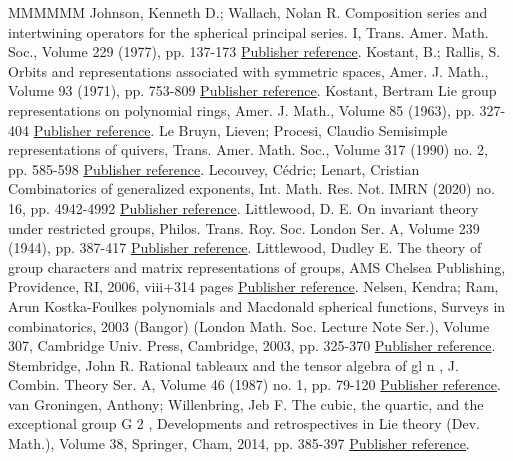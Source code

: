 \begin{thebibliography}{MMMMMM}
 Johnson, Kenneth D.; Wallach, Nolan R. Composition series and intertwining operators for the spherical principal series. I, Trans. Amer. Math. Soc., Volume 229 (1977), pp. 137-173 \href{https://alco.centre-mersenne.org/articles/10.5802/alco.391/#JohnsonWallach1977}{Publisher reference}.
 Kostant, B.; Rallis, S. Orbits and representations associated with symmetric spaces, Amer. J. Math., Volume 93 (1971), pp. 753-809 \href{https://alco.centre-mersenne.org/articles/10.5802/alco.391/#KostantRallis1971}{Publisher reference}.
 Kostant, Bertram Lie group representations on polynomial rings, Amer. J. Math., Volume 85 (1963), pp. 327-404 \href{https://alco.centre-mersenne.org/articles/10.5802/alco.391/#Kostant1963}{Publisher reference}.
 Le Bruyn, Lieven; Procesi, Claudio Semisimple representations of quivers, Trans. Amer. Math. Soc., Volume 317 (1990) no. 2, pp. 585-598 \href{https://alco.centre-mersenne.org/articles/10.5802/alco.391/#LeBryunProcesi1990}{Publisher reference}.
 Lecouvey, Cédric; Lenart, Cristian Combinatorics of generalized exponents, Int. Math. Res. Not. IMRN (2020) no. 16, pp. 4942-4992 \href{https://alco.centre-mersenne.org/articles/10.5802/alco.391/#LecouveyLenart2020}{Publisher reference}.
 Littlewood, D. E. On invariant theory under restricted groups, Philos. Trans. Roy. Soc. London Ser. A, Volume 239 (1944), pp. 387-417 \href{https://alco.centre-mersenne.org/articles/10.5802/alco.391/#Littlewood1944}{Publisher reference}.
 Littlewood, Dudley E. The theory of group characters and matrix representations of groups, AMS Chelsea Publishing, Providence, RI, 2006, viii+314 pages \href{https://alco.centre-mersenne.org/articles/10.5802/alco.391/#Littlewood1945}{Publisher reference}.
 Nelsen, Kendra; Ram, Arun Kostka-Foulkes polynomials and Macdonald spherical functions, Surveys in combinatorics, 2003 (Bangor) (London Math. Soc. Lecture Note Ser.), Volume 307, Cambridge Univ. Press, Cambridge, 2003, pp. 325-370 \href{https://alco.centre-mersenne.org/articles/10.5802/alco.391/#NelsenRam2003}{Publisher reference}.
 Stembridge, John R. Rational tableaux and the tensor algebra of  gl  n , J. Combin. Theory Ser. A, Volume 46 (1987) no. 1, pp. 79-120 \href{https://alco.centre-mersenne.org/articles/10.5802/alco.391/#STEMBRIDGE198779}{Publisher reference}.
 van Groningen, Anthony; Willenbring, Jeb F. The cubic, the quartic, and the exceptional group G 2 , Developments and retrospectives in Lie theory (Dev. Math.), Volume 38, Springer, Cham, 2014, pp. 385-397 \href{https://alco.centre-mersenne.org/articles/10.5802/alco.391/#WillenbringVanGroningen2014}{Publisher reference}.

\end{thebibliography}
